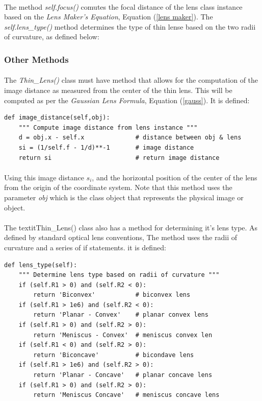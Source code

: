 \documentclass[12pt,letterpaper]{article}
\begin{document}
\paragraph*{}The method \textit{self.focus()} comutes the focal distance of the lens class instance based on the \textit{Lens Maker's Equation}, Equation (\ref{lens maker}). The \textit{self.lens\_type()} method determines the type of thin lense based on the two radii of curvature, as defined below:

\subsubsection*{Other Methods}

\paragraph*{}The \textit{Thin\_Lens()} class must have method that allows for the computation of the image distance as measured from the center of the thin lens.  This will be computed as per the \textit{Gaussian Lens Formula}, Equation (\ref{gauss}). It is defined:
\begin{verbatim}
def image_distance(self,obj):
    """ Compute image distance from lens instance """
    d = obj.x - self.x              # distance between obj & lens
    si = (1/self.f - 1/d)**-1       # image distance
    return si                       # return image distance 
\end{verbatim}
\paragraph*{}Using this image distance $s_i$, and the horizontal position of the center of the lens from the origin of the coordinate system. Note that this method uses the parameter \textit{obj} which is the class object that represents the physical image or object.

\paragraph*{}The textit{Thin\_Lens()} class also has a method for determining it's lens type. As defined by standard optical lens conventions, The method uses the radii of curvature and a series of if statements. it is defined:
\begin{verbatim}
def lens_type(self):
    """ Determine lens type based on radii of curvature """
    if (self.R1 > 0) and (self.R2 < 0):
        return 'Biconvex'           # biconvex lens
    if (self.R1 > 1e6) and (self.R2 < 0):
        return 'Planar - Convex'    # planar convex lens
    if (self.R1 > 0) and (self.R2 > 0):
        return 'Meniscus - Convex'  # meniscus convex len
    if (self.R1 < 0) and (self.R2 > 0):
        return 'Biconcave'          # bicondave lens
    if (self.R1 > 1e6) and (self.R2 > 0):
        return 'Planar - Concave'   # planar concave lens
    if (self.R1 > 0) and (self.R2 > 0):
        return 'Meniscus Concave'   # meniscus concave lens
\end{verbatim}
\end{document}
